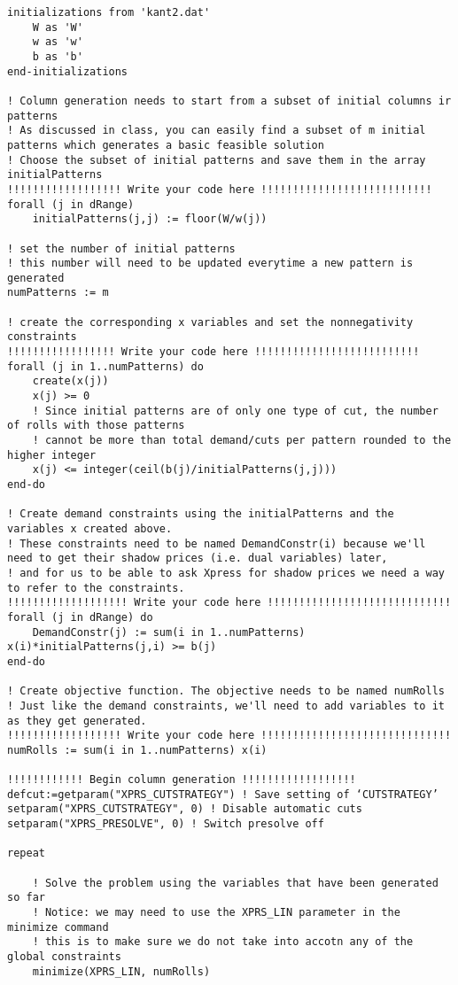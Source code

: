 \documentclass[twoside,12pt]{article}
\begin{document}
\begin{verbatim}
initializations from 'kant2.dat'
	W as 'W'
	w as 'w'
	b as 'b'
end-initializations

! Column generation needs to start from a subset of initial columns ir patterns
! As discussed in class, you can easily find a subset of m initial patterns which generates a basic feasible solution
! Choose the subset of initial patterns and save them in the array initialPatterns
!!!!!!!!!!!!!!!!!! Write your code here !!!!!!!!!!!!!!!!!!!!!!!!!!!
forall (j in dRange)
	initialPatterns(j,j) := floor(W/w(j))

! set the number of initial patterns  
! this number will need to be updated everytime a new pattern is generated
numPatterns := m	

! create the corresponding x variables and set the nonnegativity constraints
!!!!!!!!!!!!!!!!! Write your code here !!!!!!!!!!!!!!!!!!!!!!!!!!
forall (j in 1..numPatterns) do
	create(x(j))
	x(j) >= 0
	! Since initial patterns are of only one type of cut, the number of rolls with those patterns 
	! cannot be more than total demand/cuts per pattern rounded to the higher integer
	x(j) <= integer(ceil(b(j)/initialPatterns(j,j)))
end-do

! Create demand constraints using the initialPatterns and the variables x created above. 
! These constraints need to be named DemandConstr(i) because we'll need to get their shadow prices (i.e. dual variables) later, 
! and for us to be able to ask Xpress for shadow prices we need a way to refer to the constraints.
!!!!!!!!!!!!!!!!!!! Write your code here !!!!!!!!!!!!!!!!!!!!!!!!!!!!!
forall (j in dRange) do
	DemandConstr(j) := sum(i in 1..numPatterns) x(i)*initialPatterns(j,i) >= b(j)
end-do
		
! Create objective function. The objective needs to be named numRolls
! Just like the demand constraints, we'll need to add variables to it as they get generated.
!!!!!!!!!!!!!!!!!! Write your code here !!!!!!!!!!!!!!!!!!!!!!!!!!!!!!
numRolls := sum(i in 1..numPatterns) x(i)

!!!!!!!!!!!! Begin column generation !!!!!!!!!!!!!!!!!!
defcut:=getparam("XPRS_CUTSTRATEGY") ! Save setting of ‘CUTSTRATEGY’ 
setparam("XPRS_CUTSTRATEGY", 0) ! Disable automatic cuts 
setparam("XPRS_PRESOLVE", 0) ! Switch presolve off 

repeat	
	
	! Solve the problem using the variables that have been generated so far
	! Notice: we may need to use the XPRS_LIN parameter in the minimize command
	! this is to make sure we do not take into accotn any of the global constraints 
	minimize(XPRS_LIN, numRolls)
	

\end{verbatim}
\end{document}
